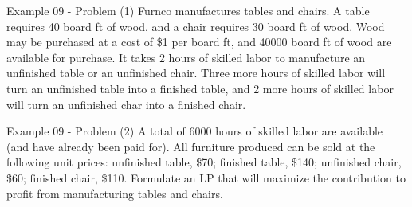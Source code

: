 \begin{frame}{Example 09 - Problem (1)}
Furnco manufactures tables and chairs. A table requires 40 board ft of wood,
and a chair requires 30 board ft of wood. Wood may be purchased at a cost of \$1
per board ft, and 40000 board ft of wood are available for purchase. It takes 2
hours of skilled labor to manufacture an unfinished table or an unfinished chair.
Three more hours of skilled labor will turn an unfinished table into a finished
table, and 2 more hours of skilled labor will turn an unfinished char into a
finished chair.
\end{frame}

\begin{frame}{Example 09 - Problem (2)}
A total of 6000 hours of skilled labor are available (and have
already been paid for). All furniture produced can be sold at the following unit
prices: unfinished table, \$70; finished table, \$140; unfinished chair, \$60;
finished chair, \$110. Formulate an LP that will maximize the contribution to
profit from manufacturing tables and chairs.
\end{frame}
